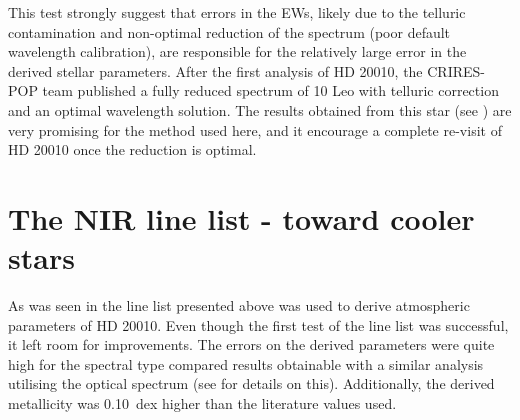 This test strongly suggest that errors in the EWs, likely due to the telluric contamination and
non-optimal reduction of the spectrum (poor default wavelength calibration), are responsible for the
relatively large error in the derived stellar parameters. After the first analysis of HD 20010, the
CRIRES-POP team published a fully reduced spectrum of 10 Leo \citep{Nicholls2017} with telluric
correction and an optimal wavelength solution. The results obtained from this star (see
) are very promising for the method used here, and it encourage a complete re-visit
of HD 20010 once the reduction is optimal.


\section{The NIR line list - toward cooler stars}
\label{sec:linelist_second}

As was seen in  the line list presented above was used to derive atmospheric
parameters of HD 20010. Even though the first test of the line list was successful, it left room for
improvements. The errors on the derived parameters were quite high for the spectral type compared
results obtainable with a similar analysis utilising the optical spectrum (see
 for details on this). Additionally, the derived metallicity was
\SI{0.10}{dex} higher than the literature values used.

